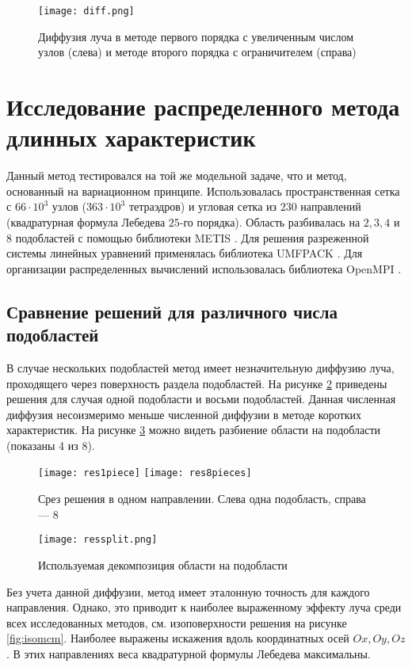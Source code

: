 \begin{figure}[ht!]
\centering
\texttt{[image: diff.png]}
\caption{Диффузия луча в методе первого порядка с увеличенным числом узлов (слева) и методе второго порядка с ограничителем (справа)}
\label{fig:diffus}
\end{figure}

\section{Исследование распределенного метода длинных характеристик}

Данный метод тестировался на той же модельной задаче, что и метод, основанный на вариационном принципе. Использовалась пространственная сетка с $66 \cdot 10^{3}$ узлов ($363 \cdot 10^{3}$ тетраэдров) и угловая сетка из $230$ направлений (квадратурная формула Лебедева $25$-го порядка). Область разбивалась на $2, 3, 4$ и $8$ подобластей с помощью библиотеки METIS \cite{METIS}.  Для решения разреженной системы линейных уравнений применялась библиотека UMFPACK \cite{umfpack2004}. Для организации распределенных вычислений использовалась библиотека OpenMPI \cite{MPI}.

\subsection{Сравнение решений для различного числа подобластей}

В случае нескольких подобластей метод имеет незначительную диффузию луча, проходящего через поверхность раздела подобластей.
На рисунке \ref{fig:diff} приведены решения для случая одной подобласти и восьми подобластей. Данная численная диффузия несоизмеримо меньше численной диффузии в методе коротких характеристик.
На рисунке \ref{fig:split} можно видеть разбиение области на подобласти (показаны 4 из 8).

\begin{figure}[ht!]
\texttt{[image: res1piece]}
\texttt{[image: res8pieces]}
\caption{Срез решения в одном направлении. Слева одна подобласть, справа --- 8}
\label{fig:diff}
\end{figure}

\begin{figure}[ht!]
\centering
\texttt{[image: ressplit.png]}
\caption{Используемая декомпозиция области на подобласти}
\label{fig:split}
\end{figure}

Без учета данной диффузии, метод имеет эталонную точность для каждого направления. Однако, это приводит к наиболее выраженному эффекту луча среди всех исследованных методов, см. изоповерхности решения на рисунке \ref{fig:isomcm}. Наиболее выражены искажения вдоль координатных осей $Ox, Oy, Oz$. В этих направлениях веса квадратурной формулы Лебедева максимальны.

